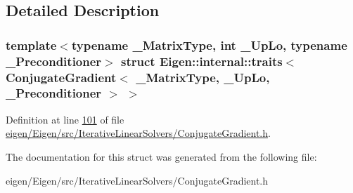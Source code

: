 \subsection{Detailed Description}
\subsubsection*{template$<$typename \+\_\+\+Matrix\+Type, int \+\_\+\+Up\+Lo, typename \+\_\+\+Preconditioner$>$\newline
struct Eigen\+::internal\+::traits$<$ Conjugate\+Gradient$<$ \+\_\+\+Matrix\+Type, \+\_\+\+Up\+Lo, \+\_\+\+Preconditioner $>$ $>$}



Definition at line \hyperlink{eigen_2_eigen_2src_2_iterative_linear_solvers_2_conjugate_gradient_8h_source_l00101}{101} of file \hyperlink{eigen_2_eigen_2src_2_iterative_linear_solvers_2_conjugate_gradient_8h_source}{eigen/\+Eigen/src/\+Iterative\+Linear\+Solvers/\+Conjugate\+Gradient.\+h}.



The documentation for this struct was generated from the following file\+:\begin{DoxyCompactItemize}
\item 
eigen/\+Eigen/src/\+Iterative\+Linear\+Solvers/\+Conjugate\+Gradient.\+h\end{DoxyCompactItemize}
